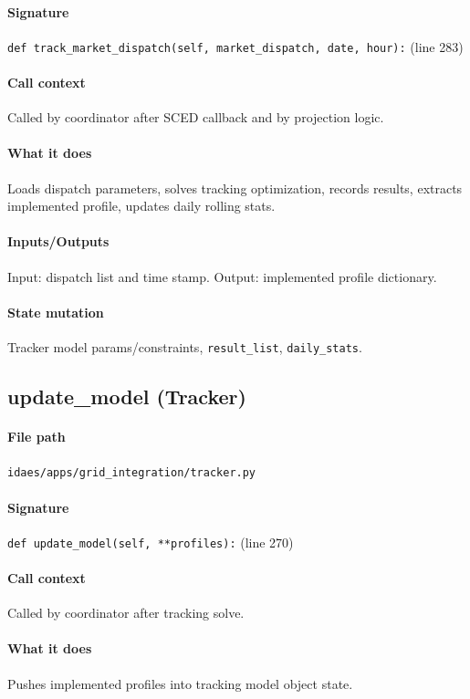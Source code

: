 \documentclass{article}
\begin{document}
\paragraph{Signature} \texttt{def track\_market\_dispatch(self, market\_dispatch, date, hour):} (line 283)
\paragraph{Call context} Called by coordinator after SCED callback and by projection logic.
\paragraph{What it does} Loads dispatch parameters, solves tracking optimization, records results, extracts implemented profile, updates daily rolling stats.
\paragraph{Inputs/Outputs} Input: dispatch list and time stamp. Output: implemented profile dictionary.
\paragraph{State mutation} Tracker model params/constraints, \texttt{result\_list}, \texttt{daily\_stats}.

\subsection{update\_model (Tracker)}\label{fn:tracker_update_model}
\paragraph{File path} \texttt{idaes/apps/grid\_integration/tracker.py}
\paragraph{Signature} \texttt{def update\_model(self, **profiles):} (line 270)
\paragraph{Call context} Called by coordinator after tracking solve.
\paragraph{What it does} Pushes implemented profiles into tracking model object state.
\end{document}
